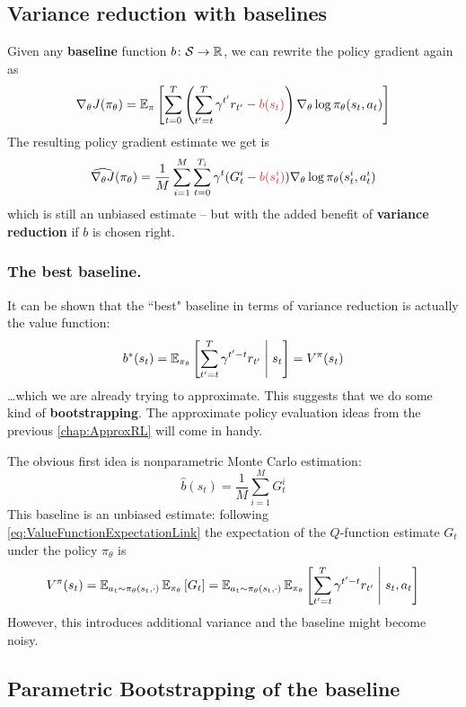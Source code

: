 \documentclass[../course-notes.tex]{subfiles}
\begin{document}
\subsection{Variance reduction with baselines}

Given any \textbf{\bluefont baseline} function $b\colon \mathcal{S} \to \mathbb{R}$, we can rewrite the policy gradient again as
\begin{equation}\label{eq:PolicyGradBaseline}
\nabla_\theta J(\pi_\theta) =
\EE_\pi \left[
\sum_{t=0}^T
\left(
\sum_{t'=t}^T \gamma^{t'} r_{t'} - {\redfont b(s_t)}
\right)
\nabla_\theta \log\pi_\theta(s_t, a_t)
\right]
\end{equation}
The resulting policy gradient estimate we get is
\begin{equation}\label{eq:MCPolicyGradBaseline}
\widehat{\nabla_\theta J}(\pi_\theta) =
\frac{1}{M}\sum_{i=1}^M
\sum_{t=0}^{T_i}
\gamma^t (G^i_t - {\redfont b(s^i_t)})
\nabla_\theta \log\pi_\theta (s_t^i, a_t^i)
\end{equation}
which is still an unbiased estimate -- but with the added benefit of \textbf{variance reduction} if $b$ is chosen right.

\subsubsection{The best baseline.}

It can be shown that the ``best" baseline in terms of variance reduction is actually the value function:
\[
b^*(s_t) = \operatorname{\mathbb{E}}_{\pi_\theta}\left[\sum_{t'=t}^T \gamma^{t'-t} r_{t'} \;\middle|\; s_t \right]
= V^\pi(s_t)
\]
\ldots which we are already trying to approximate. This suggests that we do some kind of \textbf{bootstrapping}. The approximate policy evaluation ideas from the previous \cref{chap:ApproxRL} will come in handy.

The obvious first idea is nonparametric Monte Carlo estimation:
\[
	\widehat{b}(s_t) = \frac{1}{M}\sum_{i=1}^M G^i_t
\]
This baseline is an unbiased estimate: following \cref{eq:ValueFunctionExpectationLink} the expectation of the $Q$-function estimate $G_t$ under the policy $\pi_\theta$ is
\[
	V^\pi(s_t) =
	\operatorname{\mathbb{E}}_{a_t\sim \pi_\theta(s_t,\cdot)}
	\operatorname{\mathbb{E}}_{\pi_\theta}
	\left[G_t\right] =
	\operatorname{\mathbb{E}}_{a_t\sim\pi_\theta(s_t,\cdot)}
	\operatorname{\mathbb{E}}_{\pi_\theta}
	\left[
	\sum_{t'=t}^T \gamma^{t'-t}r_{t'}
	\;\middle|\; s_t,a_t
	\right]
\]
However, this introduces additional variance and the baseline might become noisy.



\subsection{Parametric Bootstrapping of the baseline}\label{sec:REINFORCEparametricBaseline}
\end{document}
